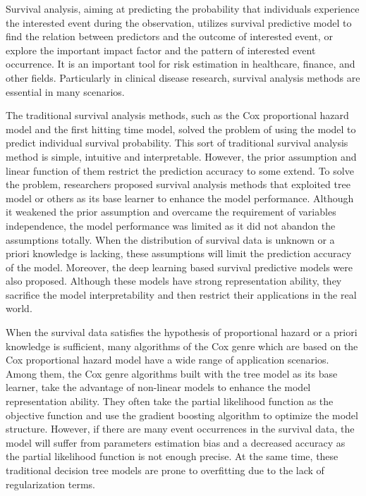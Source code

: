 
\begin{englishabstract}
	Survival analysis, aiming at predicting the probability that individuals experience the interested event during the observation, utilizes survival predictive model to find the relation between predictors and the outcome of interested event, or explore the important impact factor and the pattern of interested event occurrence. It is an important tool for risk estimation in healthcare, finance, and other fields. Particularly in clinical disease research, survival analysis methods are essential in many scenarios.
	
	The traditional survival analysis methods, such as the Cox proportional hazard model and the first hitting time model, solved the problem of using the model to predict individual survival probability. This sort of traditional survival analysis method is simple, intuitive and interpretable. However, the prior assumption and linear function of them restrict the prediction accuracy to some extend. To solve the problem, researchers proposed survival analysis methods that exploited tree model or others as its base learner to enhance the model performance. Although it weakened the prior assumption and overcame the requirement of variables independence, the model performance was limited as it did not abandon the assumptions totally. When the distribution of survival data is unknown or a priori knowledge is lacking, these assumptions will limit the prediction accuracy of the model. Moreover, the deep learning based survival predictive models were also proposed. Although these models have strong representation ability, they sacrifice the model interpretability and then restrict their applications in the real world.

    When the survival data satisfies the hypothesis of proportional hazard or a priori knowledge is sufficient, many algorithms of the Cox genre which are based on the Cox proportional hazard model have a wide range of application scenarios. Among them, the Cox genre algorithms built with the tree model as its base learner, take the advantage of  non-linear models to enhance the model representation ability. They often take the partial likelihood function as the objective function and use the gradient boosting algorithm to optimize the model structure. However, if there are many event occurrences in the survival data, the model will suffer from parameters estimation bias and a decreased accuracy as the partial likelihood function is not enough precise. At the same time, these traditional decision tree models are prone to overfitting due to the lack of regularization terms.


\end{englishabstract}
